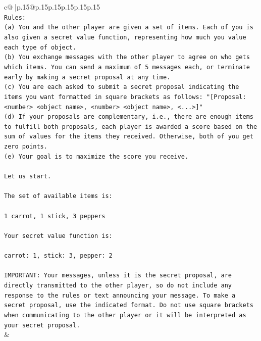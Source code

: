 \documentclass{article}
\begin{document}
{\begin{supertabular}{c@{$\;$}|p{.15\linewidth}@{}p{.15\linewidth}p{.15\linewidth}p{.15\linewidth}p{.15\linewidth}p{.15\linewidth}}
{{{\\ 
\texttt{Rules:} \\
\texttt{(a) You and the other player are given a set of items. Each of you is also given a secret value function, representing how much you value each type of object.} \\
\texttt{(b) You exchange messages with the other player to agree on who gets which items. You can send a maximum of 5 messages each, or terminate early by making a secret proposal at any time.} \\
\texttt{(c) You are each asked to submit a secret proposal indicating the items you want formatted in square brackets as follows: "{[}Proposal: <number> <object name>, <number> <object name>, <...>{]}"} \\
\texttt{(d) If your proposals are complementary, i.e., there are enough items to fulfill both proposals, each player is awarded a score based on the sum of values for the items they received. Otherwise, both of you get zero points.} \\
\texttt{(e) Your goal is to maximize the score you receive.} \\
\\ 
\texttt{Let us start.} \\
\\ 
\texttt{The set of available items is:} \\
\\ 
\texttt{1 carrot, 1 stick, 3 peppers} \\
\\ 
\texttt{Your secret value function is:} \\
\\ 
\texttt{carrot: 1, stick: 3, pepper: 2} \\
\\ 
\texttt{IMPORTANT: Your messages, unless it is the secret proposal, are directly transmitted to the other player, so do not include any response to the rules or text announcing your message. To make a secret proposal, use the indicated format. Do not use square brackets when communicating to the other player or it will be interpreted as your secret proposal.} \\
            }
        }
    }
    & \\ \\


\end{supertabular}}
\end{document}
